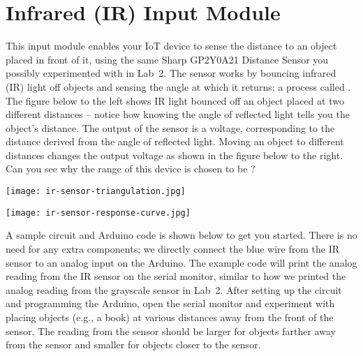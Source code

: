 
\clearpage
\section{Infrared (IR) Input Module}
\label{sec-input-ir}

This input module enables your IoT device to sense the distance to an
object placed  in front of it, using the same Sharp
GP2Y0A21 Distance Sensor you possibly experimented with in Lab~2. The
sensor works by bouncing infrared (IR) light off objects and sensing the
angle at which it returns; a process called . The
figure below to the left shows IR light bounced off an object placed at
two different distances -- notice how knowing the angle of reflected
light tells you the object's distance. The output of the sensor is a
voltage, corresponding to the distance derived from the angle of
reflected light. Moving an object to different distances changes the
output voltage as shown in the figure below to the right. Can you see
why the range of this device is chosen to be ?

\vspace{0.1in}
\begin{minipage}[t]{0.49\tw}
  \texttt{[image: ir-sensor-triangulation.jpg]}
\end{minipage}
\hfill
\begin{minipage}[t]{0.49\tw}
  \texttt{[image: ir-sensor-response-curve.jpg]}
\end{minipage}
\vspace{0.1in}

A sample circuit and Arduino code is shown below to get you started.
There is no need for any extra components; we directly connect the blue
wire from the IR sensor to an analog input on the Arduino. The example
code will print the analog reading from the IR sensor on the serial
monitor, similar to how we printed the analog reading from the grayscale
sensor in Lab~2. After setting up the circuit and programming the
Arduino, open the serial monitor and experiment with placing objects
(e.g., a book) at various distances away from the front of the sensor.
The reading from the sensor should be larger for objects farther away
from the sensor and smaller for objects closer to the sensor.

